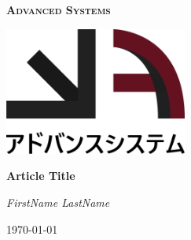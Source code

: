 \documentclass[a4paper]{article}
\newcommand*{\dauthor}{FirstName LastName}
\newcommand*{\dorg}{Advanced Systems}
\newcommand*{\dtitle}{Article Title}
\begin{document}
\begin{titlepage}
    \centering
    {\scshape\Huge\bfseries{\dorg}\par}
    \par\vspace{1cm}
    \includegraphics[width=0.45\textwidth]{images/logo.png}\par
    \vspace{3cm}
    {\huge\bfseries\dtitle\par}
    \vspace{1cm}
    {\LARGE\itshape\dauthor\par}
    \vspace{1cm}
    {\large\today\par}
    \vfill
    \begin{abstract}
        \lipsum[2-4][12-18]
    \end{abstract}
\end{titlepage}

\newpage

\printnoidxglossary[type=\acronymtype]

\newpage

\tableofcontents
{}

\newpage







\newpage

\medskip
\printbibliography
\end{document}
